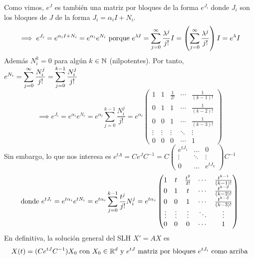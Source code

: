Como vimos, $e^J$ es también una matriz por bloques de la forma $e^{J_i}$ donde $J_i$ son los bloques de $J$ de la forma $J_i = \alpha_i I + N_i$.
\[\implies e^{J_i} = e^{\alpha_i I + N_i} = e^{\alpha_i} e^{N_i} \text{ porque } e^{\lambda I} = \sum_{j=0}^{\infty} \frac{\lambda^j}{j!} I = \left(\sum_{j=0}^{\infty} \frac{\lambda^j}{j!}\right) I = e^{\lambda} I\]
Además $N_i^k = 0$ para algún $k \in \mathbb{N}$ (nilpotentes). Por tanto, $\displaystyle e^{N_i} = \sum_{j=0}^{\infty} \frac{N_i^j}{j!} = \sum_{j=0}^{k-1} \frac{N_i^j}{j!}$
\[\implies e^{J_i} = e^{\alpha_i} e^{N_i} = e^{\alpha_i} \sum_{j=0}^{k-1} \frac{N_i^j}{j!} = e^{\alpha_i} \begin{pmatrix}
		1      & 1      & \frac{1}{2!} & \cdots & \frac{1}{(k-1)!} \\
		0      & 1      & 1            & \cdots & \frac{1}{(k-2)!} \\
		0      & 0      & 1            & \cdots & \frac{1}{(k-3)!} \\
		\vdots & \vdots & \vdots       & \ddots & \vdots           \\
		0      & 0      & 0            & \cdots & 1
	\end{pmatrix}\]
Sin embargo, lo que nos interesa es $e^{tA} = Ce^{J}C^{-1} = C \begin{pmatrix}
		e^{t J_1} & \dots  & 0         \\
		\vdots    & \ddots & \vdots    \\
		0         & \dots  & e^{t J_k}
	\end{pmatrix} C^{-1}$
\[\text{donde }e^{t J_i} = e^{t\alpha_i}e^{tN_i} = e^{t\alpha_i} \sum_{j=0}^{k-1} \frac{t^j}{j!} N_i^j = e^{t\alpha_i} \begin{pmatrix}
		1      & t      & \frac{t^2}{2!} & \cdots & \frac{t^{k-1}}{(k-1)!} \\
		0      & 1      & t              & \cdots & \frac{t^{k-2}}{(k-2)!} \\
		0      & 0      & 1              & \cdots & \frac{t^{k-3}}{(k-3)!} \\
		\vdots & \vdots & \vdots         & \ddots & \vdots                 \\
		0      & 0      & 0              & \cdots & 1
	\end{pmatrix}\]
En definitiva, la solución general del SLH $X' = AX$ es
\[X(t) = (Ce^{tJ}C^{-1})X_0 \text{ con } X_0 \in \mathbb{R}^d \text{ y } e^{tJ} \text{ matriz por bloques } e^{tJ_i} \text{ como arriba}\]

